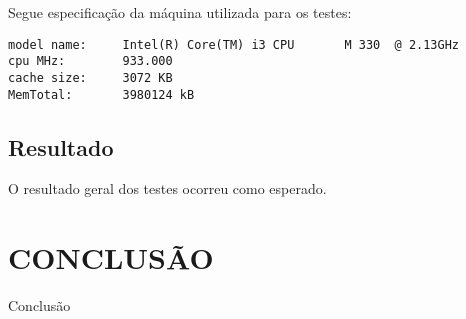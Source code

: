 \documentclass[12pt]{article}
\begin{document}
Segue especificação da máquina utilizada para os testes:
\begin{verbatim}
model name:     Intel(R) Core(TM) i3 CPU       M 330  @ 2.13GHz
cpu MHz:        933.000
cache size:     3072 KB
MemTotal:       3980124 kB
\end{verbatim}


\subsection{Resultado}

	O resultado geral dos testes ocorreu como esperado.

\section{CONCLUSÃO}
\label{conclusao}

    Conclusão



\end{document}
